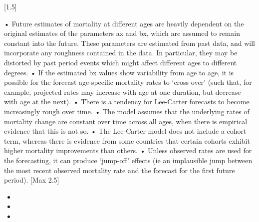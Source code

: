 [1.5]
\item  
• Future estimates of mortality at different ages are heavily dependent on the original estimates of the parameters ax and bx, which are assumed to remain constant into the future. These parameters are estimated from past data, and will incorporate any roughness contained in the data. In particular, they may be distorted by past period events which might affect different ages to different degrees. 
• If the estimated bx values show variability from age to age, it is possible for the forecast age-specific mortality rates to ‘cross over’ (such that, for example, projected rates may increase with age at one duration, but decrease with age at the next). 
• There is a tendency for Lee-Carter forecasts to become increasingly rough over time. 
• The model assumes that the underlying rates of mortality change are constant over time across all ages, when there is empirical evidence that this is not so. 
• The Lee-Carter model does not include a cohort term, whereas there is evidence from some countries that certain cohorts exhibit higher mortality improvements than others. 
• Unless observed rates are used for the forecasting, it can produce ‘jump-off’ effects (ie an implausible jump between the most recent observed mortality rate and the forecast for the first future period). 
[Max 2.5]

\begin{itemize}
\item 
\item 
\item 
\end{itemize}
